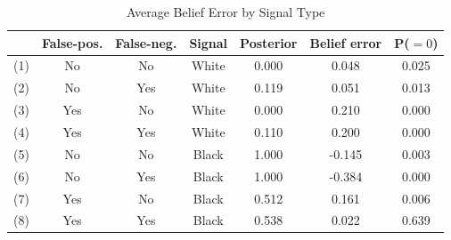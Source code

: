 \begin{table}[H]\centering \caption{Average Belief Error by Signal Type} \begin{tabular}{ccccccc} \hline \hline
 &\textbf{False-pos.}&\textbf{False-neg.}&\textbf{Signal}&\textbf{Posterior}&\textbf{Belief error}& \textbf{P($=0$)}\\ \hline
(1)&No&No&White&0.000&0.048&0.025\\
(2)&No&Yes&White&0.119&0.051&0.013\\
(3)&Yes&No&White&0.000&0.210&0.000\\
(4)&Yes&Yes&White&0.110&0.200&0.000\\
(5)&No&No&Black&1.000&-0.145&0.003\\
(6)&No&Yes&Black&1.000&-0.384&0.000\\
(7)&Yes&No&Black&0.512&0.161&0.006\\
(8)&Yes&Yes&Black&0.538&0.022&0.639\\
\hline \end{tabular} \end{table}
